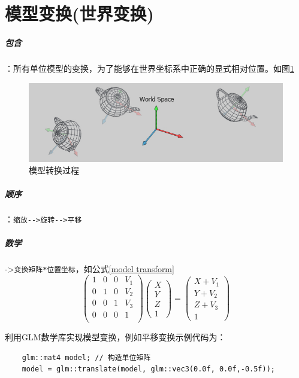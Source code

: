\documentclass[UTF8,a4paper,12pt]{ctexbook}
\begin{document}
		
		
	\section{模型变换(世界变换)}
			\subparagraph{包含}：所有单位模型的变换，为了能够在世界坐标系中正确的显式相对位置。如图\ref{mxzh}
				\begin{figure}[H]
					\centering
					\includegraphics[width=.8\linewidth]{transferModel.png}
					\caption{模型转换过程}
					\label{mxzh}
				\end{figure}
			
			\subparagraph{顺序}：\verb|缩放-->旋转-->平移|
		
			\subparagraph{数学}->\verb|变换矩阵*位置坐标|，如公式\ref{model transform}
					\begin{equation}\label{model transform}
					\left(
					\begin{array}{cccc}
					1 & 0 & 0& V_1\\
					
					0 & 1 & 0& V_2\\
					
					0 & 0 & 1& V_3\\
					
					0 & 0 & 0& 1\\
					\end{array}
					\right)
					\left(
					\begin{array}{c}
					X\\ 
					Y\\
					Z\\
					1 
					\end{array}	
					\right) 
					=
					\left(
					\begin{array}{c}
					X+V_1\\ 
					Y+V_2\\
					Z+V_3\\
					1 
					\end{array}	
					\right)
					\end{equation}
		
		
			利用GLM数学库实现模型变换，例如平移变换示例代码为：
			\begin{lstlisting}
	glm::mat4 model; // 构造单位矩阵
	model = glm::translate(model, glm::vec3(0.0f, 0.0f,-0.5f));
			\end{lstlisting}
			
\end{document}
